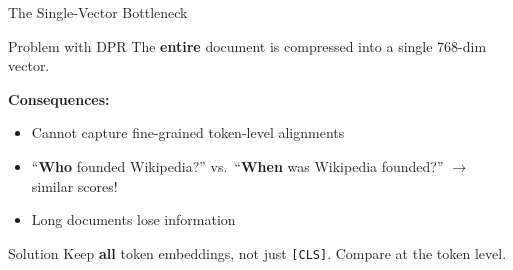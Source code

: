 \documentclass[aspectratio=169]{beamer}
\newif\ifanimated
\newcommand{\cpause}{\ifanimated\pause\fi}
\newcommand{\vd}{\mathbf{d}}
\begin{document}
\begin{frame}{The Single-Vector Bottleneck}
\begin{alertblock}{Problem with DPR}
The \textbf{entire} document is compressed into a single 768-dim vector.
\end{alertblock}

\vspace{0.5em}

\begin{center}
\end{center}

\cpause
\vspace{0.5em}

\textbf{Consequences:}
\begin{itemize}
    \item Cannot capture fine-grained token-level alignments
    \item ``\textbf{Who} founded Wikipedia?'' vs.\ ``\textbf{When} was Wikipedia founded?'' $\to$ similar scores!
    \item Long documents lose information
\end{itemize}

\cpause
\vspace{0.5em}

\begin{exampleblock}{Solution}
Keep \textbf{all} token embeddings, not just \texttt{[CLS]}. Compare at the token level.
\end{exampleblock}
\end{frame}
\end{document}
